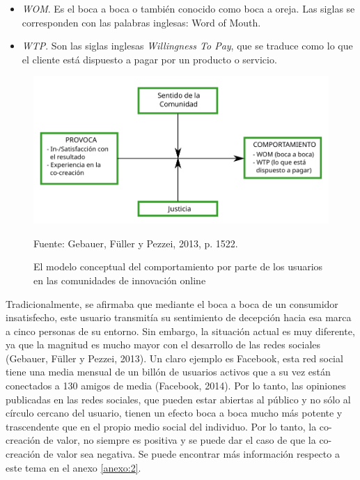 \begin{itemize}
	\item \emph{WOM}. Es el boca a boca o también conocido como boca a oreja. Las siglas se corresponden con las palabras inglesas: Word of Mouth.
	\item \emph{WTP}. Son las siglas inglesas \emph{Willingness To Pay}, que se traduce como lo que el cliente está dispuesto a pagar por un producto o servicio.

\end{itemize}

\begin{figure}[!h]
	\caption{El modelo conceptual del comportamiento por parte de los usuarios en las comunidades de innovación online}
	\centering \includegraphics[width=130mm]{capitulos/graficos/WomGebauer} 
	\label{fig:WomGebauer} 
	
		\footnotesize
		Fuente: Gebauer, Füller y Pezzei, 2013, p. 1522.
\end{figure}


Tradicionalmente, se afirmaba que mediante el boca a boca de un consumidor insatisfecho, este usuario transmitía su sentimiento de decepción hacia esa marca a cinco personas de su entorno. Sin embargo, la situación actual es muy diferente, ya que la magnitud es mucho mayor con el desarrollo de las redes sociales (Gebauer, Füller y Pezzei, 2013). Un claro ejemplo es Facebook, esta red social tiene una media mensual de un billón de usuarios activos que a su vez están conectados a 130 amigos de media (Facebook, 2014). Por lo tanto, las opiniones publicadas en las redes sociales, que pueden estar abiertas al público y no sólo al círculo cercano del usuario, tienen un efecto boca a boca mucho más potente y trascendente que en el propio medio social del individuo. Por lo tanto, la co-creación de valor, no siempre es positiva y se puede dar el caso de que la co-creación de valor sea negativa. Se puede encontrar más información respecto a este tema en el anexo \ref{anexo:2}.

